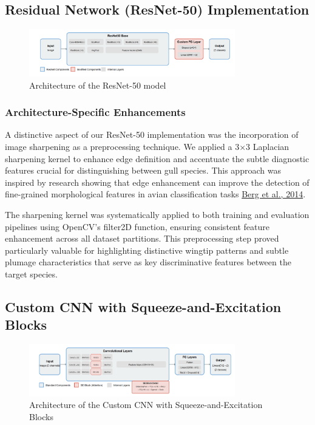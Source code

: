 \documentclass[a4paper,12pt]{report}
\begin{document}
\subsection{Residual Network (ResNet-50) Implementation}

\begin{figure}[h]
    \centering
    \includegraphics[width=0.8\textwidth]{images/architecture/resnet.png}
    \caption{Architecture of the ResNet-50 model}
    \label{fig:resnet_architecture}
\end{figure}

\subsubsection{Architecture-Specific Enhancements}

A distinctive aspect of our ResNet-50 implementation was the incorporation of image sharpening as a preprocessing technique. We applied a 3×3 Laplacian sharpening kernel to enhance edge definition and accentuate the subtle diagnostic features crucial for distinguishing between gull species. This approach was inspired by research showing that edge enhancement can improve the detection of fine-grained morphological features in avian classification tasks {\href{https://openaccess.thecvf.com/content_cvpr_2014/papers/Berg_Birdsnap_Large-scale_Fine-grained_2014_CVPR_paper.pdf}{Berg et al., 2014}}.

The sharpening kernel was systematically applied to both training and evaluation pipelines using OpenCV's filter2D function, ensuring consistent feature enhancement across all dataset partitions. This preprocessing step proved particularly valuable for highlighting distinctive wingtip patterns and subtle plumage characteristics that serve as key discriminative features between the target species.

\subsection{Custom CNN with Squeeze-and-Excitation Blocks}

\begin{figure}[h]
    \centering
    \includegraphics[width=0.8\textwidth]{images/architecture/improvedcnn.png}
    \caption{Architecture of the Custom CNN with Squeeze-and-Excitation Blocks}
    \label{fig:improvedcnn_architecture}
\end{figure}
\end{document}
